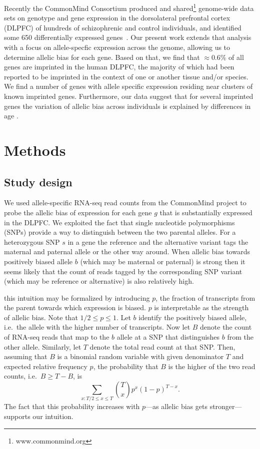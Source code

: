 \documentclass[letterpaper]{article}
\begin{document}
Recently the CommonMind Consortium produced and
shared\footnote{www.commonmind.org} genome-wide data sets on genotype and gene
expression in the dorsolateral prefrontal cortex (DLPFC) of hundreds of
schizophrenic and control individuals, and identified some 650 differentially
expressed genes~\cite{Fromer2016a}. Our present work extends that analysis
with a focus on allele-specfic expression across the genome, allowing us to
determine allelic bias for each gene.  Based on that, we find that \(\approx
0.6\%\) of all genes are imprinted in the human DLPFC, the majority of which
had been reported to be imprinted in the context of one or another tissue
and/or species. We find a number of genes with allele specific expression
residing near clusters of known imprinted genes. Furthermore, our data suggest
that for several imprinted genes the variation of allelic bias across
individuals is explained by differences in  age .

\section{Methods}

\subsection{Study design}

We used allele-specific RNA-seq read counts from the CommonMind project to
probe the allelic bias of expression for each gene \(g\) that is
substantially expressed in the DLPFC.  We exploited the fact that single
nucleotide polymorphisms (SNPs) provide a way to distinguish between the two
parental alleles.  For a heterozygous SNP \(s\) in a gene the reference and the
alternative variant tags the maternal and paternal allele or the other way
around.  When allelic bias towards positively biased allele \(b\) (which may
be maternal or paternal) is strong then it seems likely that the count of
reads tagged by the corresponding SNP variant (which may be reference or
alternative) is also relatively high.

this intuition may be formalized by introducing \(p\), the fraction of
transcripts from the parent towards which expression is biased.  \(p\) is
interpretable as the strength of allelic bias.  Note that \(1/2\le p\le 1\).
Let \(b\) identify the positively biased allele, i.e.~the allele with the
higher number of transcripts.  Now let \(B\) denote the count of RNA-seq reads
that map to the \(b\) allele at a SNP that distinguishes \(b\) from the other
allele.  Similarly, let \(T\) denote the total read count at that SNP.  Then,
assuming that \(B\) is a binomial random variable with given denominator \(T\)
and expected relative frequency \(p\), the probability that \(B\) is the
higher of the two read counts, i.e.~\(B \ge T - B\), is \[\sum_{x:T/2\le x\le
T} {T \choose x} p^x (1 - p)^{T-x}.\] The fact that this probability increases
with \(p\)---as allelic bias gets stronger---supports our intuition.
\end{document}
